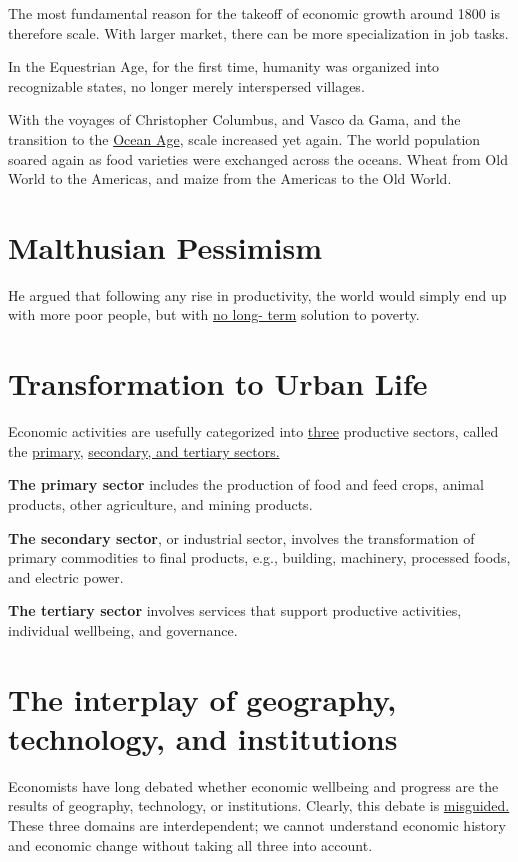 \documentclass[12pt]{article}
\begin{document}
The most fundamental reason for the takeoff of economic growth around
1800 is therefore scale. With larger market, there can be more
specialization in job tasks.

In the Equestrian Age, for the first time, humanity was organized into
recognizable states, no longer merely interspersed villages.

With the voyages of Christopher Columbus, and Vasco da Gama, and the
transition to the {\underline {Ocean Age}}, scale increased yet again.
The world population soared again as food varieties were exchanged
across the oceans. Wheat from Old World to the Americas, and maize
from the Americas to the Old World.



\section{Malthusian Pessimism}
He argued that following any rise in productivity, the world would 
simply end up with more poor people, but with {\underline {no long-
term}} solution to poverty.


\section{Transformation to Urban Life}
Economic activities are usefully categorized into {\underline {three}}
productive sectors, called the {\underline {primary}},
{\underline {secondary, and tertiary sectors.}}

{\textbf {The primary sector}} includes the production of food and
feed crops, animal products, other agriculture, and mining products.

{\textbf {The secondary sector}}, or industrial sector, involves 
the transformation of primary commodities to final products, e.g., 
building, machinery, processed foods, and electric power.

{\textbf {The tertiary sector}} involves services that support 
productive activities, individual wellbeing, and governance.



\section{The interplay of geography, technology, and institutions}
Economists have long debated whether economic wellbeing and progress
are the results of geography, technology, or institutions.
Clearly, this debate is {\underline {misguided.}} These three domains
are interdependent; we cannot understand economic history and economic
change without taking all three into account.
\end{document}
